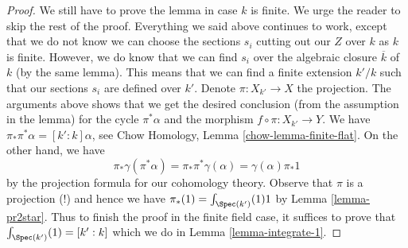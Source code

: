 \begin{proof}
\medskip\noindent
We still have to prove the lemma in case $k$ is finite. We urge the
reader to skip the rest of the proof. Everything we said above continues
to work, except that we do not know we can choose the sections
$s_i$ cutting out our $Z$ over $k$ as $k$ is finite. However, we do
know that we can find $s_i$ over the algebraic closure $\overline{k}$
of $k$ (by the same lemma). This means that we can
find a finite extension $k'/k$ such that our sections $s_i$
are defined over $k'$. Denote $\pi : X_{k'} \to X$ the projection.
The arguments above shows that we get the desired conclusion
(from the assumption in the lemma)
for the cycle $\pi^*\alpha$ and the morphism
$f \circ \pi : X_{k'} \to Y$.
We have $\pi_*\pi^*\alpha = [k' : k] \alpha$, see
Chow Homology, Lemma \ref{chow-lemma-finite-flat}.
On the other hand, we have
$$
\pi_*\gamma(\pi^*\alpha) = \pi_*\pi^*\gamma(\alpha) =
\gamma(\alpha) \pi_*1
$$
by the projection formula for our cohomology theory. Observe
that $\pi$ is a projection (!) and hence we have
$\pi_*(1) = \int_{\Spec(k')}(1) 1$ by
Lemma \ref{lemma-pr2star}. Thus to finish the proof in the
finite field case, it suffices to prove that
$\int_{\Spec(k')}(1) = [k' : k]$ which we do in
Lemma \ref{lemma-integrate-1}.
\end{proof}
